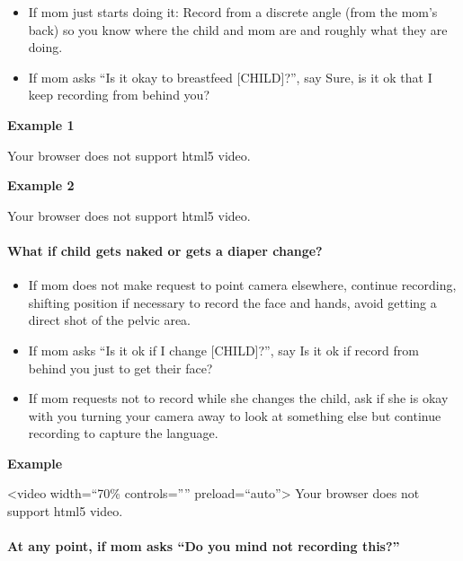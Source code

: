 \documentclass[
  12pt,
]{book}
\providecommand{\tightlist}{%
  \setlength{\itemsep}{0pt}\setlength{\parskip}{0pt}}
\begin{document}
\begin{itemize}
\tightlist
\item
  If mom just starts doing it: Record from a discrete angle (from the mom's back) so you know where the child and mom are and roughly what they are doing.
\item
  If mom asks ``Is it okay to breastfeed {[}CHILD{]}?'', say Sure, is it ok that I keep recording from behind you?
\end{itemize}

\textbf{Example 1}

Your browser does not support html5 video.

\textbf{Example 2}

Your browser does not support html5 video.

\hypertarget{what-if-child-gets-naked-or-gets-a-diaper-change}{%
\paragraph*{What if child gets naked or gets a diaper change?}\label{what-if-child-gets-naked-or-gets-a-diaper-change}}

\begin{itemize}
\tightlist
\item
  If mom does not make request to point camera elsewhere, continue recording, shifting position if necessary to record the face and hands, avoid getting a direct shot of the pelvic area.
\item
  If mom asks ``Is it ok if I change {[}CHILD{]}?'', say Is it ok if record from behind you just to get their face?
\item
  If mom requests not to record while she changes the child, ask if she is okay with you turning your camera away to look at something else but continue recording to capture the language.
\end{itemize}

\textbf{Example}

\textless video width=``70\% controls='''' preload=``auto''\textgreater{}
Your browser does not support html5 video.

\hypertarget{at-any-point-if-mom-asks-do-you-mind-not-recording-this}{%
\paragraph*{At any point, if mom asks ``Do you mind not recording this?''}\label{at-any-point-if-mom-asks-do-you-mind-not-recording-this}}
\end{document}
